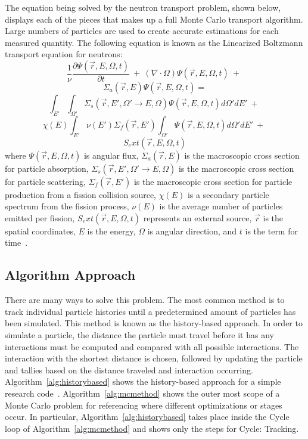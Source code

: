 %
The equation being solved by the neutron transport problem, shown below, displays each of the pieces that makes up a full Monte Carlo transport algorithm.
%
Large numbers of particles are used to create accurate estimations for each measured quantity.
%
The following equation is known as the Linearized Boltzmann transport equation for neutrons:
%
$$
\frac{1}{\nu} \frac{ \partial \Psi ( \vec{r}, E, \Omega, t ) }{\partial t}\ +\ 
(\nabla \cdot \Omega ) \Psi ( \vec{r}, E, \Omega, t )\ +\
$$
$$ 
\Sigma_a (\vec{r}, E ) \Psi ( \vec{r}, E, \Omega, t ) =$$
$$
\int _{E '} \int _{\Omega '} \Sigma_{s} ( \vec{r}, E', \Omega ' \rightarrow E, \Omega ) \Psi (\vec{r}, E, \Omega, t) d \Omega ' dE'\ +\ 
$$
$$
\chi (E) \int _{E'} \nu (E') \Sigma_{f} (\vec{r},E') \int _{\Omega '} \Psi ( \vec{r}, E, \Omega, t ) d \Omega ' dE'\ +\ $$
$$
S_ext(\vec{r}, E, \Omega, t )
$$
%
where $ \Psi ( \vec{r}, E, \Omega, t ) $ is angular flux, 
$\Sigma_a (\vec{r}, E )$ is the macroscopic cross section for particle absorption, 
$\Sigma_{s} ( \vec{r}, E', \Omega ' \rightarrow E, \Omega )$ is the macroscopic cross section for particle scattering,
$\Sigma_{f} (\vec{r},E') $ is the macroscopic cross section for particle production from a fission collision source,
$\chi (E)$ is a secondary particle spectrum from the fission process,
$\nu (E)$ is the average number of particles emitted per fission,
$S_ext(\vec{r}, E, \Omega, t )$ represents an external source,
$\vec{r}$ is the spatial coordinates,
$E$ is the energy,
$\Omega$ is angular direction,
and $t$ is the term for time~\cite{gentileMCPTAPO}.
%

\subsection{ \textbf{ Algorithm Approach} }

There are many ways to solve this problem.
%
The most common method is to track individual particle histories until a predetermined amount of particles has been simulated.
%
This method is known as the history-based approach.
%
In order to simulate a particle, the distance the particle must travel before it has any interactions must be computed and compared with all possible interactions.
%
The interaction with the shortest distance is chosen, followed by updating the particle and tallies based on the distance traveled and interaction occurring.
% 
Algorithm~\ref{alg:historybased} shows the history-based approach for a simple research code~\cite{alpsmc1}.
%
Algorithm~\ref{alg:mcmethod} shows the outer most scope of a Monte Carlo problem for referencing where different optimizations or stages occur.
%
In particular, Algorithm~\ref{alg:historybased} takes place inside the Cycle loop of Algorithm~\ref{alg:mcmethod} and shows only the steps for Cycle: Tracking.

